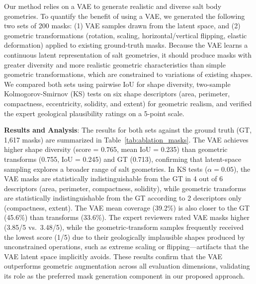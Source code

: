 \documentclass{ieeeaccess}
\begin{document}
Our method relies on a VAE to generate realistic and diverse salt body geometries. To quantify the benefit of using a VAE, we generated the following two sets of 200 masks: (1) VAE samples drawn from the latent space, and (2) geometric transformations (rotation, scaling, horizontal/vertical flipping, elastic deformation) applied to existing ground-truth masks. Because the VAE learns a continuous latent representation of salt geometries, it should produce masks with greater diversity and more realistic geometric characteristics than simple geometric transformations, which are constrained to variations of existing shapes. We compared both sets using pairwise IoU for shape diversity, two-sample Kolmogorov-Smirnov (KS) tests on six shape descriptors (area, perimeter, compactness, eccentricity, solidity, and extent) for geometric realism, and verified the expert geological plausibility ratings on a 5-point scale.

\textbf{Results and Analysis}: The results for both sets against the ground truth (GT, 1,617 masks) are summarized in Table~\ref{tab:ablation_masks}. The VAE achieves higher shape diversity (score = 0.765, mean IoU = 0.235) than geometric transforms (0.755, IoU = 0.245) and GT (0.713), confirming that latent-space sampling explores a broader range of salt geometries. In KS tests ($\alpha = 0.05$), the VAE masks are statistically indistinguishable from the GT in 4 out of 6 descriptors (area, perimeter, compactness, solidity), while geometric transforms are statistically indistinguishable from the GT according to 2 descriptors only (compactness, extent). The VAE mean coverage (39.2\%) is also closer to the GT (45.6\%) than transforms (33.6\%). The expert reviewers rated VAE masks higher (3.85/5 vs.\ 3.48/5), while the geometric-transform samples frequently received the lowest score (1/5) due to their geologically implausible shapes produced by unconstrained operations, such as extreme scaling or flipping---artifacts that the VAE latent space implicitly avoids. These results confirm that the VAE outperforms geometric augmentation across all evaluation dimensions, validating its role as the preferred mask generation component in our proposed approach.
\end{document}
